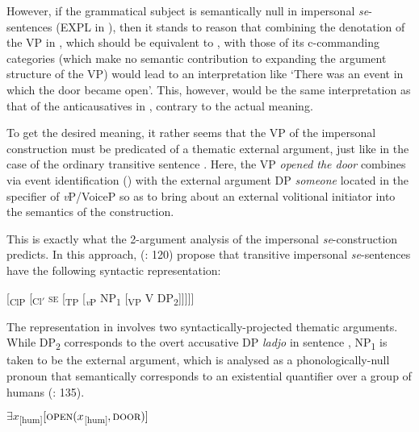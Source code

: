 \documentclass[output=paper,
modfonts,nonflat,
newtxmath
]{langsci/langscibook}
\begin{document}
 \noindent However, if the grammatical subject is semantically null in impersonal \textit{se}-sentences (EXPL in ), then it stands to reason that combining the denotation of the VP in , which should be equivalent to , with those of its c-commanding categories (which make no semantic contribution to expanding the argument structure of the VP) would lead to an interpretation like `There was an event in which the door became open'. This, however, would be the same interpretation as that of the anticausatives in , contrary to the actual meaning. \par
 
To get the desired meaning, it rather seems that the VP of the impersonal construction must be predicated of a thematic external argument, just like in the case of the ordinary transitive sentence . Here, the VP \textit{opened the door} combines via event identification (\citealt{kratzer1996}) with the external argument DP \textit{someone} located in the specifier of \textit{v}P/VoiceP so as to bring about an external volitional initiator into the semantics of the construction. \par

This is exactly what the 2-argument analysis of the impersonal \textit{se}-construction predicts. In this approach, \citeauthor{riverosheppard2003} (\citeyear{riverosheppard2003}: 120) propose that transitive impersonal \textit{se}-sentences have the following syntactic representation:

\begin{exe}
\ex \label{ex:lenardic: 10} {[\textsubscript{ClP} [\textsubscript{Cl$'$} \textsc{se} [\textsubscript{TP} [\textsubscript{\textit{v}P} NP\textsubscript{1} [\textsubscript{VP} V DP\textsubscript{2}]]]]]}
\end{exe} \par

\noindent The representation in  involves two syntactically-projected thematic arguments. While DP\textsubscript{2} corresponds to the overt accusative DP \textit{ladjo} in sentence , NP\textsubscript{1} is taken to be the external argument, which is analysed as a phonologically-null pronoun that semantically corresponds to an existential quantifier over a group of humans (\citealt{riverosheppard2003}: 135).

\begin{exe}
\ex \label{ex:lenardic: 11} $\exists x$\textsubscript{[hum]}$[\textsc{open}(x$\textsubscript{[hum]}$, \textsc{door})]$
\end{exe} \par
\end{document}
